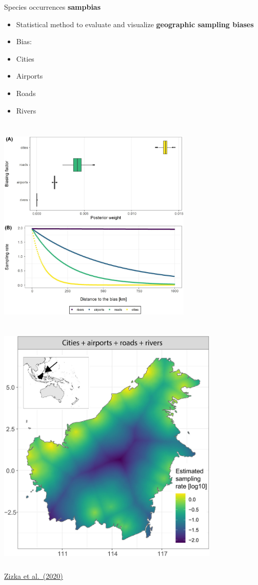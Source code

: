\documentclass[
  ignorenonframetext,
]{beamer}
\providecommand{\tightlist}{%
  \setlength{\itemsep}{0pt}\setlength{\parskip}{0pt}}\usepackage{longtable,booktabs,array}
\begin{document}
\begin{frame}{Species occurrences}
\label{species-occurrences-8}
\textbf{sampbias}

\begin{itemize}
\tightlist
\item
  Statistical method to evaluate and visualize \textbf{geographic
  sampling biases}
\item
  Bias:
\end{itemize}

\begin{itemize}
\tightlist
\item
  Cities
\item
  Airports
\item
  Roads
\item
  Rivers
\end{itemize}

\includegraphics[width=3.64583in,height=4.16667in]{img/occ_bias_map1.jpg}
\includegraphics[width=4.16667in,height=4.6875in]{img/occ_bias_map.jpg}

\href{https://doi.org/10.1111/ecog.05102}{Zizka et al.~(2020)}
\end{frame}
\end{document}
